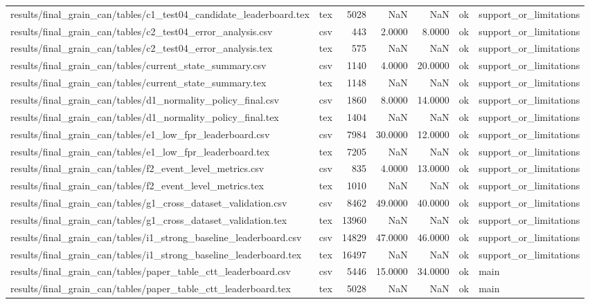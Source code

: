 \begin{tabular}{llrrrll}
results/final_grain_can/tables/c1_test04_candidate_leaderboard.tex & tex & 5028 & NaN & NaN & ok & support_or_limitations \\
results/final_grain_can/tables/c2_test04_error_analysis.csv & csv & 443 & 2.0000 & 8.0000 & ok & support_or_limitations \\
results/final_grain_can/tables/c2_test04_error_analysis.tex & tex & 575 & NaN & NaN & ok & support_or_limitations \\
results/final_grain_can/tables/current_state_summary.csv & csv & 1140 & 4.0000 & 20.0000 & ok & support_or_limitations \\
results/final_grain_can/tables/current_state_summary.tex & tex & 1148 & NaN & NaN & ok & support_or_limitations \\
results/final_grain_can/tables/d1_normality_policy_final.csv & csv & 1860 & 8.0000 & 14.0000 & ok & support_or_limitations \\
results/final_grain_can/tables/d1_normality_policy_final.tex & tex & 1404 & NaN & NaN & ok & support_or_limitations \\
results/final_grain_can/tables/e1_low_fpr_leaderboard.csv & csv & 7984 & 30.0000 & 12.0000 & ok & support_or_limitations \\
results/final_grain_can/tables/e1_low_fpr_leaderboard.tex & tex & 7205 & NaN & NaN & ok & support_or_limitations \\
results/final_grain_can/tables/f2_event_level_metrics.csv & csv & 835 & 4.0000 & 13.0000 & ok & support_or_limitations \\
results/final_grain_can/tables/f2_event_level_metrics.tex & tex & 1010 & NaN & NaN & ok & support_or_limitations \\
results/final_grain_can/tables/g1_cross_dataset_validation.csv & csv & 8462 & 49.0000 & 40.0000 & ok & support_or_limitations \\
results/final_grain_can/tables/g1_cross_dataset_validation.tex & tex & 13960 & NaN & NaN & ok & support_or_limitations \\
results/final_grain_can/tables/i1_strong_baseline_leaderboard.csv & csv & 14829 & 47.0000 & 46.0000 & ok & support_or_limitations \\
results/final_grain_can/tables/i1_strong_baseline_leaderboard.tex & tex & 16497 & NaN & NaN & ok & support_or_limitations \\
results/final_grain_can/tables/paper_table_ctt_leaderboard.csv & csv & 5446 & 15.0000 & 34.0000 & ok & main \\
results/final_grain_can/tables/paper_table_ctt_leaderboard.tex & tex & 5028 & NaN & NaN & ok & main \\

\end{tabular}
